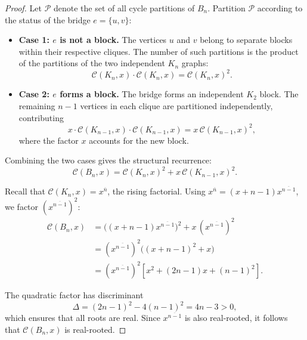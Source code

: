 \documentclass{amsart}
\newcounter{cases}
\theoremstyle{definition}
\begin{document}
\begin{proof}
Let $\mathcal{P}$ denote the set of all cycle partitions of $B_n$. Partition $\mathcal{P}$ according to the status of the bridge $e = \{u,v\}$:

\begin{itemize}
    \item \textbf{Case 1: $e$ is not a block.}  
    The vertices $u$ and $v$ belong to separate blocks within their respective cliques. The number of such partitions is the product of the partitions of the two independent $K_n$ graphs:
    \[
        \mathcal{C}(K_n,x) \cdot \mathcal{C}(K_n,x) = \mathcal{C}(K_n,x)^2.
    \]

    \item \textbf{Case 2: $e$ forms a block.}  
    The bridge forms an independent $K_2$ block. The remaining $n-1$ vertices in each clique are partitioned independently, contributing
    \[
        x \cdot \mathcal{C}(K_{n-1},x) \cdot \mathcal{C}(K_{n-1},x) = x \, \mathcal{C}(K_{n-1},x)^2,
    \]
    where the factor $x$ accounts for the new block.
\end{itemize}

Combining the two cases gives the structural recurrence:
\[
\mathcal{C}(B_n, x) = \mathcal{C}(K_n, x)^2 + x \, \mathcal{C}(K_{n-1}, x)^2.
\]

Recall that $\mathcal{C}(K_n,x) = x^{\overline{n}}$, the rising factorial. Using $x^{\overline{n}} = (x+n-1)x^{\overline{n-1}}$, we factor $(x^{\overline{n-1}})^2$:
\begin{align*}
    \mathcal{C}(B_n, x) &= \bigl((x+n-1)x^{\overline{n-1}}\bigr)^2 + x \,(x^{\overline{n-1}})^2 \\
    &= (x^{\overline{n-1}})^2 \bigl((x+n-1)^2 + x\bigr) \\
    &= (x^{\overline{n-1}})^2 \left[x^2 + (2n-1)x + (n-1)^2\right].
\end{align*}

The quadratic factor has discriminant
\[
\Delta = (2n-1)^2 - 4(n-1)^2 = 4n-3 > 0,
\]
which ensures that all roots are real. Since $x^{\overline{n-1}}$ is also real-rooted, it follows that $\mathcal{C}(B_n,x)$ is real-rooted.
\end{proof}
\end{document}
